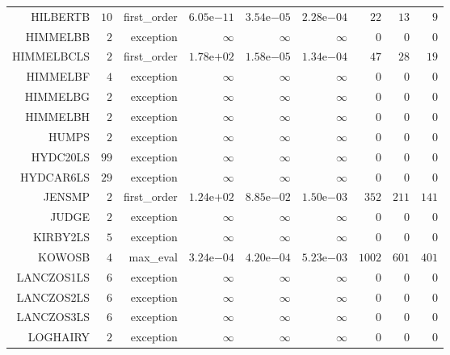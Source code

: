 \begin{longtable}{rrrrrrrrr}
HILBERTB & \(    10\) & first\_order & \( 6.05\)e\(-11\) & \( 3.54\)e\(-05\) & \( 2.28\)e\(-04\) & \(    22\) & \(    13\) & \(     9\) \\
HIMMELBB & \(     2\) & exception & \(\infty\) & \(\infty\) & \(\infty\) & \(     0\) & \(     0\) & \(     0\) \\
HIMMELBCLS & \(     2\) & first\_order & \( 1.78\)e\(+02\) & \( 1.58\)e\(-05\) & \( 1.34\)e\(-04\) & \(    47\) & \(    28\) & \(    19\) \\
HIMMELBF & \(     4\) & exception & \(\infty\) & \(\infty\) & \(\infty\) & \(     0\) & \(     0\) & \(     0\) \\
HIMMELBG & \(     2\) & exception & \(\infty\) & \(\infty\) & \(\infty\) & \(     0\) & \(     0\) & \(     0\) \\
HIMMELBH & \(     2\) & exception & \(\infty\) & \(\infty\) & \(\infty\) & \(     0\) & \(     0\) & \(     0\) \\
HUMPS & \(     2\) & exception & \(\infty\) & \(\infty\) & \(\infty\) & \(     0\) & \(     0\) & \(     0\) \\
HYDC20LS & \(    99\) & exception & \(\infty\) & \(\infty\) & \(\infty\) & \(     0\) & \(     0\) & \(     0\) \\
HYDCAR6LS & \(    29\) & exception & \(\infty\) & \(\infty\) & \(\infty\) & \(     0\) & \(     0\) & \(     0\) \\
JENSMP & \(     2\) & first\_order & \( 1.24\)e\(+02\) & \( 8.85\)e\(-02\) & \( 1.50\)e\(-03\) & \(   352\) & \(   211\) & \(   141\) \\
JUDGE & \(     2\) & exception & \(\infty\) & \(\infty\) & \(\infty\) & \(     0\) & \(     0\) & \(     0\) \\
KIRBY2LS & \(     5\) & exception & \(\infty\) & \(\infty\) & \(\infty\) & \(     0\) & \(     0\) & \(     0\) \\
KOWOSB & \(     4\) & max\_eval & \( 3.24\)e\(-04\) & \( 4.20\)e\(-04\) & \( 5.23\)e\(-03\) & \(  1002\) & \(   601\) & \(   401\) \\
LANCZOS1LS & \(     6\) & exception & \(\infty\) & \(\infty\) & \(\infty\) & \(     0\) & \(     0\) & \(     0\) \\
LANCZOS2LS & \(     6\) & exception & \(\infty\) & \(\infty\) & \(\infty\) & \(     0\) & \(     0\) & \(     0\) \\
LANCZOS3LS & \(     6\) & exception & \(\infty\) & \(\infty\) & \(\infty\) & \(     0\) & \(     0\) & \(     0\) \\
LOGHAIRY & \(     2\) & exception & \(\infty\) & \(\infty\) & \(\infty\) & \(     0\) & \(     0\) & \(     0\) \\

\end{longtable}
